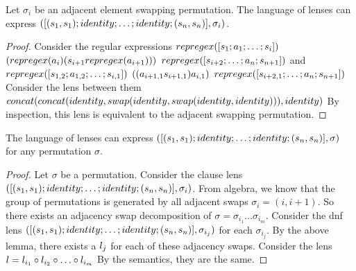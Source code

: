 \begin{lemma}
Let $\sigma_{i}$ be an adjacent element swapping permutation.  The language of
lenses can express $([(s_1,s_1) ; identity ; \ldots ; identity ; (s_n,s_n)], \sigma_{i})$.
\begin{proof}
Consider the regular expressions $repregex([s_1;a_1; \ldots;s_i])$ $(repregex(a_i) (s_{i+1} repregex(a_{i+1})))$ $repregex([s_{i+2} ; \ldots ; a_{n} ; s_{n+1}])$ and 
$repregex([s_{1,2};a_{1,2}; \ldots;s_{i,1}])$ $((a_{i+1,1} s_{i+1,1})a_{i,1})$ $repregex([s_{i+2,1} ; \ldots ; a_{n} ; s_{n+1}])$
Consider the lens between them\\ $concat(concat(identity,swap(identity,swap(identity,identity))),identity)$
By inspection, this lens is equivalent to the adjacent swapping permutation.
\end{proof}
\end{lemma}

\begin{lemma}
The language of lenses can express $([(s_1,s_1) ; identity ; \ldots ; identity ; (s_n,s_n)], \sigma)$
for any permutation $\sigma$.
\begin{proof}
Let $\sigma$ be a permutation.
Consider the clause lens $([(s_1,s_1) ; identity ; \ldots ; identity ; (s_n,s_n)], \sigma_{i})$.
From algebra, we know that the group of permutations is generated by all
adjacent swaps $\sigma_i = (i,i+1)$.
So there exists an adjacency swap decomposition of $\sigma = \sigma_{i_1}\ldots\sigma_{i_m}$.
Consider the dnf lens $([(s_1,s_1) ; identity ; \ldots ; identity ; (s_n,s_n)], \sigma_{i_j})$ for each $\sigma_{i_j}$.
By the above lemma, there exists a $l_j$ for each of these adjacency swaps.
Consider the lens $l = l_{i_1} \circ l_{i_2} \circ \ldots  \circ l_{i_m}$
By the semantics, they are the same.

\end{proof}
\end{lemma}

